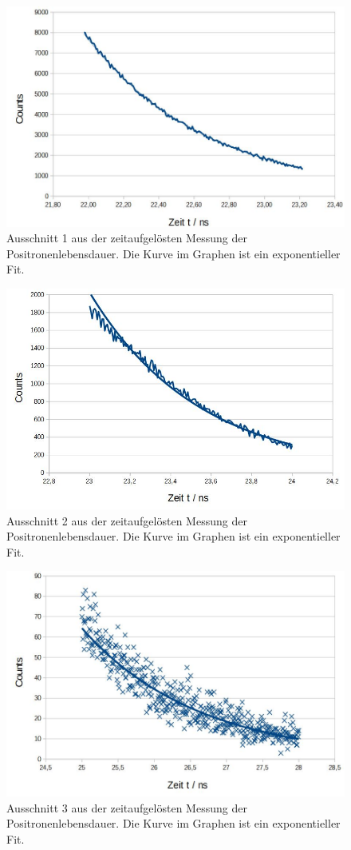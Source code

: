 \documentclass[numbers=noenddot,12pt,a4paper]{scrartcl}
\begin{document}
\begin{figure}[!h]
	\centering
	\includegraphics[width=0.7\columnwidth]{pics/Messung2a}
	\caption{Ausschnitt 1 aus der zeitaufgelösten Messung der Positronenlebensdauer. Die Kurve im Graphen ist ein exponentieller Fit.}
\end{figure}
\begin{figure}[!h]
	\centering
	\includegraphics[width=0.7\columnwidth]{pics/Messung2b}
	\caption{Ausschnitt 2 aus der zeitaufgelösten Messung der Positronenlebensdauer. Die Kurve im Graphen ist ein exponentieller Fit.}
\end{figure}
\begin{figure}[!h]
	\centering
	\includegraphics[width=0.7\columnwidth]{pics/Messung2c}
	\caption{Ausschnitt 3 aus der zeitaufgelösten Messung der Positronenlebensdauer. Die Kurve im Graphen ist ein exponentieller Fit.}
\end{figure}
\end{document}
